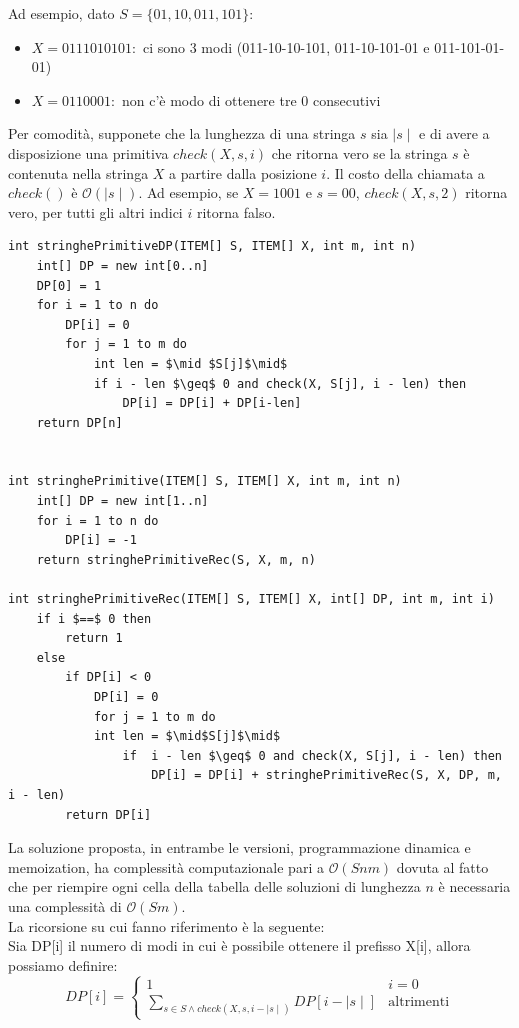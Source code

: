 \documentclass[../cheatSheetAlgoritmi.tex]{subfiles}
\begin{document}
Ad esempio, dato $S=\{01,10,011,101\}$:
\begin{itemize}
	\item $X = 0111010101: $ ci sono 3 modi
(011-10-10-101, 011-10-101-01 e 011-101-01-01)
	\item $X = 0110001:$ non c’è modo di ottenere tre $0$ consecutivi
\end{itemize}
Per comodità, supponete che la lunghezza di una stringa $s$ sia $\mid s \mid$ e di avere a disposizione una primitiva $check(X, s, i)$ che ritorna vero se la stringa $s$ è contenuta nella stringa $X$ a partire dalla posizione $i$. Il costo della chiamata a $check()$ è $\mathcal{O}(\mid s \mid)$. Ad esempio, se $X=1001$ e $s=00$, $check(X, s,2)$ ritorna vero, per tutti gli altri indici $i$ ritorna falso.
\begin{lstlisting}[caption=Stringhe primitive]
int stringhePrimitiveDP(ITEM[] S, ITEM[] X, int m, int n)
	int[] DP = new int[0..n]
	DP[0] = 1
	for i = 1 to n do
		DP[i] = 0
		for j = 1 to m do
			int len = $\mid $S[j]$\mid$
			if i - len $\geq$ 0 and check(X, S[j], i - len) then
				DP[i] = DP[i] + DP[i-len]
	return DP[n]


int stringhePrimitive(ITEM[] S, ITEM[] X, int m, int n)
	int[] DP = new int[1..n]
	for i = 1 to n do
		DP[i] = -1
	return stringhePrimitiveRec(S, X, m, n)

int stringhePrimitiveRec(ITEM[] S, ITEM[] X, int[] DP, int m, int i)
	if i $==$ 0 then
		return 1
	else
		if DP[i] < 0 
			DP[i] = 0
			for j = 1 to m do
			int len = $\mid$S[j]$\mid$
				if  i - len $\geq$ 0 and check(X, S[j], i - len) then
					DP[i] = DP[i] + stringhePrimitiveRec(S, X, DP, m, i - len)
		return DP[i]		
\end{lstlisting}
La soluzione proposta, in entrambe le versioni, programmazione dinamica e memoization, ha complessità computazionale pari a $\mathcal{O}(Snm)$ dovuta al fatto che per riempire ogni cella della tabella delle soluzioni di lunghezza $n$ è necessaria una complessità di $\mathcal{O}(Sm)$. \\
La ricorsione su cui fanno riferimento è la seguente: \\
Sia DP[i] il numero di modi in cui è possibile ottenere il prefisso X[i], allora possiamo definire: 
\begin{equation*}
  	DP[i] =\begin{cases}
        1 & \text{$i = 0$} \\ 
        \sum_{s \in S \land check(X, s, i - \mid s\mid)} DP[i - \mid s \mid] & \text{altrimenti}
  	\end{cases}
\end{equation*}
\end{document}
